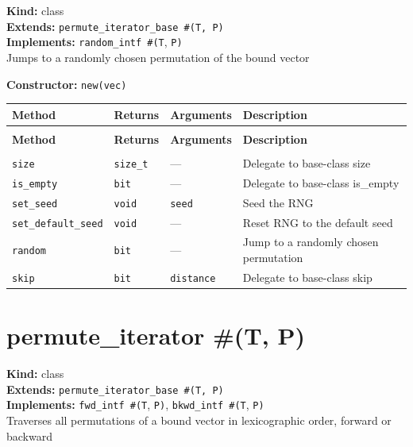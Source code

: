 \documentclass[11pt,letterpaper]{report}
\begin{document}
\noindent\textbf{Kind:} class\\
\noindent\textbf{Extends:} \texttt{permute\_iterator\_base \#(T, P)}\\
\noindent\textbf{Implements:} \texttt{random\_intf \#(T}, \texttt{P)}\\
\noindent Jumps to a randomly chosen permutation of the bound vector

\noindent\textbf{Constructor:} \texttt{new(vec)}

\begin{xltabular}{\linewidth}{>{\small}p{1.35in} >{\small}p{1.25in} >{\small}p{0.95in} >{\small}X}
\toprule
\textbf{Method} & \textbf{Returns} & \textbf{Arguments} & \textbf{Description} \\
\midrule
\endfirsthead
{} \\
\midrule
\textbf{Method} & \textbf{Returns} & \textbf{Arguments} & \textbf{Description} \\
\midrule
\endhead
\midrule
{} \\
\endfoot
\bottomrule
\endlastfoot
\texttt{size} & \texttt{size\_t} & --- & Delegate to base-class size \\
\texttt{is\_empty} & \texttt{bit} & --- & Delegate to base-class is\_empty \\
\texttt{set\_seed} & \texttt{void} & \texttt{seed} & Seed the RNG \\
\texttt{set\_default\_seed} & \texttt{void} & --- & Reset RNG to the default seed \\
\texttt{random} & \texttt{bit} & --- & Jump to a randomly chosen permutation \\
\texttt{skip} & \texttt{bit} & \texttt{distance} & Delegate to base-class skip \\
\end{xltabular}

\section{permute\_iterator \#(T, P)}
\label{cls:permuteiteratorTP}

\noindent\textbf{Kind:} class\\
\noindent\textbf{Extends:} \texttt{permute\_iterator\_base \#(T, P)}\\
\noindent\textbf{Implements:} \texttt{fwd\_intf \#(T}, \texttt{P)}, \texttt{bkwd\_intf \#(T}, \texttt{P)}\\
\noindent Traverses all permutations of a bound vector in lexicographic order, forward or backward
\end{document}
